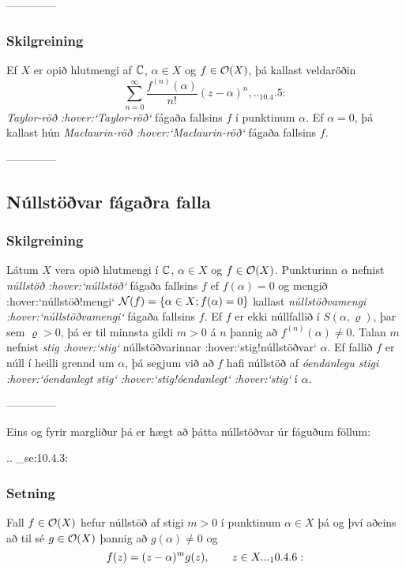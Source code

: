 --------------




\subsubsection{Skilgreining}
Ef $X$ er opið hlutmengi af ${\mathbb C}$, $\alpha\in X$ og $f\in {\cal O}(X)$, þá
kallast veldaröðin
 \begin{equation*}\sum\limits_{n=0}^\infty \dfrac{f^{(n)}(\alpha)}{n!}(z-\alpha)^n,

.. _10.4.5:

 \end{equation*}
{\it Taylor-röð :hover:`Taylor-röð`} fágaða fallsins $f$ í punktinum $\alpha$.  Ef
$\alpha=0$, þá kallast hún {\it Maclaurin-röð :hover:`Maclaurin-röð`}
fágaða fallsins $f$. 


--------------




\subsection*{Núllstöðvar fágaðra falla}



\subsubsection{Skilgreining}
Látum  $X$ vera opið hlutmengi í ${\mathbb C}$, $\alpha\in X$ og $f\in {\cal O}(X)$.
Punkturinn $\alpha$ nefnist {\it
núllstöð :hover:`núllstöð`} fágaða
fallsins $f$ ef $f(\alpha)=0$ og mengið :hover:`núllstöð!mengi` ${\cal N}(f)=\{\alpha\in X;
f(\alpha)=0\}$ kallast {\it núllstöðvamengi :hover:`núllstöðvamengi`}
fágaða fallsins $f$. Ef $f$ er ekki núllfallið í
$S(\alpha,\varrho)$, þar sem $\varrho>0$, 
þá er til minnsta gildi $m>0$ á $n$ þannig að
$f^{(n)}(\alpha)\neq 0$.  
Talan $m$  nefnist {\it stig :hover:`stig`}
núllstöðvarinnar :hover:`stig!núllstöðvar`
$\alpha$.  Ef fallið $f$ er núll í heilli grennd um 
$\alpha$, þá segjum við að $f$ hafi núllstöð af {\it óendanlegu
stigi :hover:`óendanlegt stig` :hover:`stig!óendanlegt` :hover:`stig`} í $\alpha$.


--------------




Eins og fyrir margliður þá er hægt að þátta núllstöðvar úr fáguðum föllum:



.. _se:10.4.3:

\subsubsection{Setning}   Fall $f\in {\cal O}(X)$ hefur núllstöð af stigi $m>0$ í punktinum
$\alpha\in X$ þá og því aðeins að til sé $g\in {\cal O}(X)$ þannig að
$g(\alpha)\neq 0$ og
 \begin{equation*}f(z)=(z-\alpha)\sp mg(z), \qquad z\in X.


.. _10.4.6:

 \end{equation*}


